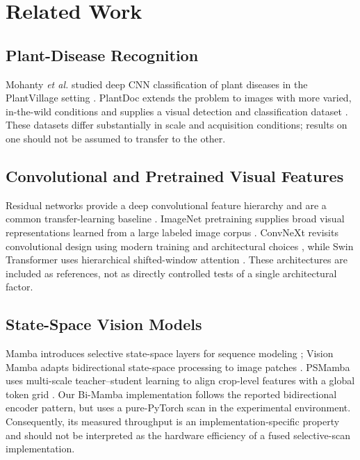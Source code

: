 \documentclass[conference]{IEEEtran}
\begin{document}
\section{Related Work}
\subsection{Plant-Disease Recognition}
Mohanty \textit{et al.} studied deep CNN classification of plant diseases in the PlantVillage setting \cite{mohanty2016plantdisease}. PlantDoc extends the problem to images with more varied, in-the-wild conditions and supplies a visual detection and classification dataset \cite{singh2020plantdoc}. These datasets differ substantially in scale and acquisition conditions; results on one should not be assumed to transfer to the other.

\subsection{Convolutional and Pretrained Visual Features}
Residual networks provide a deep convolutional feature hierarchy and are a common transfer-learning baseline \cite{he2016resnet}. ImageNet pretraining supplies broad visual representations learned from a large labeled image corpus \cite{deng2009imagenet}. ConvNeXt revisits convolutional design using modern training and architectural choices \cite{liu2022convnext}, while Swin Transformer uses hierarchical shifted-window attention \cite{liu2021swin}. These architectures are included as references, not as directly controlled tests of a single architectural factor.

\subsection{State-Space Vision Models}
Mamba introduces selective state-space layers for sequence modeling \cite{gu2024mamba}; Vision Mamba adapts bidirectional state-space processing to image patches \cite{zhu2024visionmamba}. PSMamba uses multi-scale teacher--student learning to align crop-level features with a global token grid \cite{almamun2026psmamba}. Our Bi-Mamba implementation follows the reported bidirectional encoder pattern, but uses a pure-PyTorch scan in the experimental environment. Consequently, its measured throughput is an implementation-specific property and should not be interpreted as the hardware efficiency of a fused selective-scan implementation.
\end{document}
